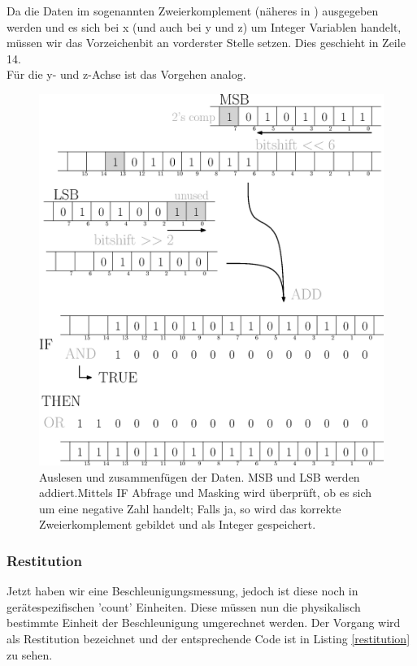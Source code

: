 \documentclass[12pt,a4paper]{scrartcl}
\begin{document}
Da die Daten im sogenannten Zweierkomplement (näheres in \citep{Tietze:2002fk}) ausgegeben werden und es sich bei x (und auch bei y und z) um Integer Variablen handelt, müssen wir das Vorzeichenbit an vorderster Stelle setzen. Dies geschieht in Zeile 14.\\

Für die y- und z-Achse ist das Vorgehen analog.




\begin{figure}[H]
\centering
\includegraphics[scale=.6]{auslesen.eps}
\caption{Auslesen und zusammenfügen der Daten. MSB und LSB werden addiert.Mittels IF Abfrage und Masking wird überprüft, ob es sich um eine negative Zahl handelt; Falls ja, so wird das korrekte Zweierkomplement gebildet und als Integer gespeichert.}
\label{auslesen}
\end{figure}


\subsubsection{Restitution}

Jetzt haben wir eine Beschleunigungsmessung, jedoch ist diese noch in gerätespezifischen 'count' Einheiten. Diese müssen nun die physikalisch bestimmte Einheit der Beschleunigung umgerechnet werden. Der Vorgang wird als Restitution bezeichnet und der entsprechende Code ist in Listing \ref{restitution} zu sehen.
\end{document}
